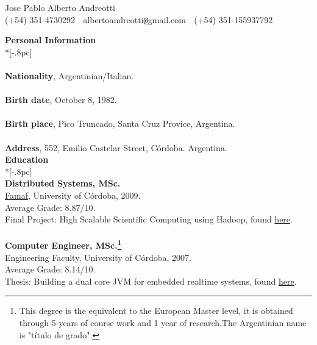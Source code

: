 \documentclass[letter,11pt,english]{article}
\begin{document}
\pagestyle{headings}
\setcounter{page}{1}

\begin{center}
{\Large Jose Pablo Alberto Andreotti} \\[.5pc]
(+54) 351-4730292 $\;$ albertoandreotti\verb|@|gmail.com $\;$ (+54) 351-155937792 \\[3pc]
\end{center}
{\large \bf Personal Information} \\*[-.8pc]
\underline{\hspace{6in}} \\
\\
{\bf Nationality}, Argentinian/Italian.\\
\\
{\bf Birth date}, October 8, 1982. \\
\\
{\bf Birth place}, Pico Truncado, Santa Cruz Provice, Argentina.\\
\\
{\bf Address}, 552, Emilio Castelar Street, C\'ordoba. Argentina.\\

{\large \bf Education} \\*[-.8pc]
\underline{\hspace{6in}} \\
{\bf Distributed Systems, MSc.}\\
\href{http://www.famaf.unc.edu.ar/}{Famaf}, University of C\'ordoba, 2009. \\
Average Grade: 8.87/10. \\
Final Project: High Scalable Scientific Computing using Hadoop, found \href{https://docs.google.com/viewer?a=v&pid=explorer&chrome=true&srcid=0B5AOpwg8IzVANjJlODZhZDctNWUzMS00MmNhLWI3OWMtMWNhMTdjODQwNjVl&hl=en}{here}.\\
\\
{\bf Computer Engineer, MSc.\footnote {This degree is the equivalent to the European Master level, it is obtained
through 5 years of course work and 1 year of research.The Argentinian name is "t\'itulo de grado".}}\\
Engineering Faculty, University of C\'ordoba, 2007.\\
Average Grade: 8.14/10. \\
Thesis: Building a dual core JVM for embedded realtime systems, found \href{https://docs.google.com/viewer?a=v&pid=explorer&chrome=true&srcid=1gdJXYgQtLDHDOxGDtbKzdmAl1LmNx-yo4w6vNl-K_Z-1YocLhtJxMvoqGvd1&hl=en}{here}.\\
\end{document}

